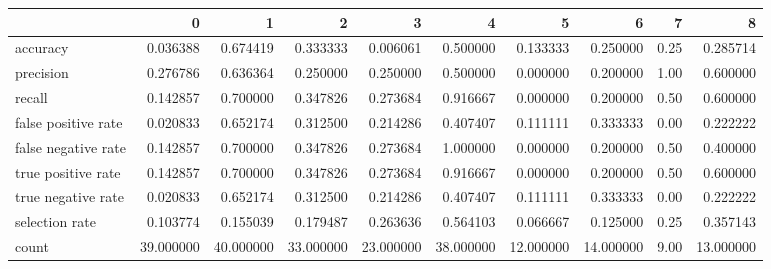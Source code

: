 \begin{tabular}{lrrrrrrrrr}
\toprule
{} &          0 &          1 &          2 &          3 &          4 &          5 &          6 &     7 &          8 \\
\midrule
accuracy            &   0.036388 &   0.674419 &   0.333333 &   0.006061 &   0.500000 &   0.133333 &   0.250000 &  0.25 &   0.285714 \\
precision           &   0.276786 &   0.636364 &   0.250000 &   0.250000 &   0.500000 &   0.000000 &   0.200000 &  1.00 &   0.600000 \\
recall              &   0.142857 &   0.700000 &   0.347826 &   0.273684 &   0.916667 &   0.000000 &   0.200000 &  0.50 &   0.600000 \\
false positive rate &   0.020833 &   0.652174 &   0.312500 &   0.214286 &   0.407407 &   0.111111 &   0.333333 &  0.00 &   0.222222 \\
false negative rate &   0.142857 &   0.700000 &   0.347826 &   0.273684 &   1.000000 &   0.000000 &   0.200000 &  0.50 &   0.400000 \\
true positive rate  &   0.142857 &   0.700000 &   0.347826 &   0.273684 &   0.916667 &   0.000000 &   0.200000 &  0.50 &   0.600000 \\
true negative rate  &   0.020833 &   0.652174 &   0.312500 &   0.214286 &   0.407407 &   0.111111 &   0.333333 &  0.00 &   0.222222 \\
selection rate      &   0.103774 &   0.155039 &   0.179487 &   0.263636 &   0.564103 &   0.066667 &   0.125000 &  0.25 &   0.357143 \\
count               &  39.000000 &  40.000000 &  33.000000 &  23.000000 &  38.000000 &  12.000000 &  14.000000 &  9.00 &  13.000000 \\
\bottomrule
\end{tabular}
